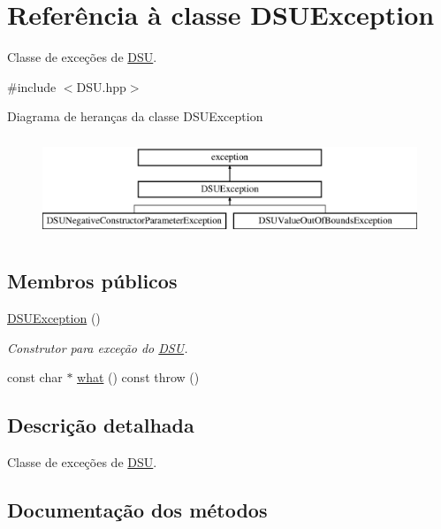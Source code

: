 \hypertarget{classDSUException}{}\section{Referência à classe D\+S\+U\+Exception}
\label{classDSUException}


Classe de exceções de \mbox{\hyperlink{classDSU}{D\+SU}}.  




{\ttfamily \#include $<$D\+S\+U.\+hpp$>$}

Diagrama de heranças da classe D\+S\+U\+Exception\begin{figure}[H]
\begin{center}
\leavevmode
\includegraphics[height=3.000000cm]{classDSUException}
\end{center}
\end{figure}
\subsection*{Membros públicos}
\begin{DoxyCompactItemize}
\item 
\mbox{\label{classDSUException_a7b5b0014b41c73335cdb76b5a48be47a}} 
\mbox{\hyperlink{classDSUException_a7b5b0014b41c73335cdb76b5a48be47a}{D\+S\+U\+Exception}} ()
\begin{DoxyCompactList}\small\item\em Construtor para exceção do \mbox{\hyperlink{classDSU}{D\+SU}}. \end{DoxyCompactList}\item 
const char $\ast$ \mbox{\hyperlink{classDSUException_a997fa79b5a7cd55cc30792da2303ea3a}{what}} () const  throw ()
\end{DoxyCompactItemize}


\subsection{Descrição detalhada}
Classe de exceções de \mbox{\hyperlink{classDSU}{D\+SU}}. 

\subsection{Documentação dos métodos}
\mbox{\label{classDSUException_a997fa79b5a7cd55cc30792da2303ea3a}} 
